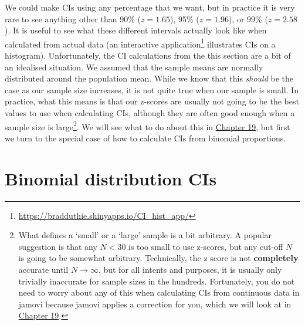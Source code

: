 \documentclass[
]{scrbook}
\begin{document}
We could make CIs using any percentage that we want, but in practice it is very rare to see anything other than 90\% (\(z = 1.65\)), 95\% (\(z = 1.96\)), or 99\% (\(z = 2.58\)).
It is useful to see what these different intervals actually look like when calculated from actual data (an interactive application\footnote{\url{https://bradduthie.shinyapps.io/CI_hist_app/}} illustrates CIs on a histogram).
Unfortunately, the CI calculations from the this section are a bit of an idealised situation.
We assumed that the sample means are normally distributed around the population mean.
While we know that this \emph{should} be the case as our sample size increases, it is not quite true when our sample is small.
In practice, what this means is that our z-scores are usually not going to be the best values to use when calculating CIs, although they are often good enough when a sample size is large\footnote{What defines a `small' or a `large' sample is a bit arbitrary. A popular suggestion \citep[e.g.,][ page 145]{Sokal1995} is that any \(N < 30\) is too small to use z-scores, but any cut-off \(N\) is going to be somewhat arbitrary. Technically, the z score is not \textbf{completely} accurate until \(N \to \infty\), but for all intents and purposes, it is usually only trivially inaccurate for sample sizes in the hundreds. Fortunately, you do not need to worry about any of this when calculating CIs from continuous data in jamovi because jamovi applies a correction for you, which we will look at in \protect\hyperlink{Chapter_19}{Chapter 19}.}.
We will see what to do about this in \protect\hyperlink{Chapter_19}{Chapter 19}, but first we turn to the special case of how to calculate CIs from binomial proportions.

\hypertarget{binomial-distribution-cis}{%
\section{Binomial distribution CIs}\label{binomial-distribution-cis}}
\end{document}
